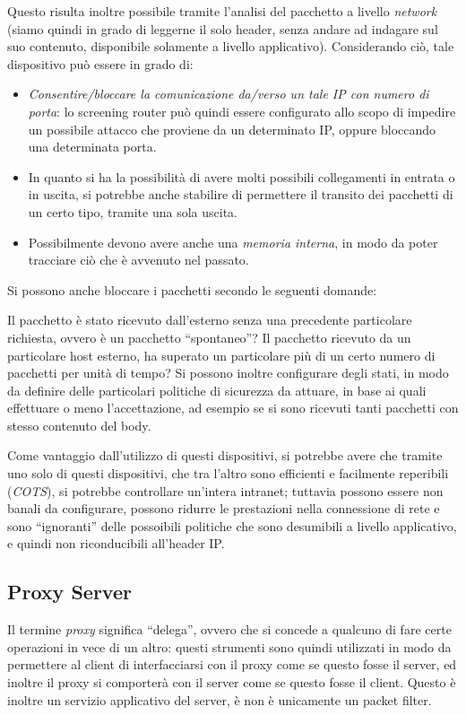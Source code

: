 Questo risulta inoltre possibile tramite l'analisi del pacchetto a livello
\textit{network} (siamo quindi in grado di leggerne il solo header, senza andare ad
indagare sul suo contenuto, disponibile solamente a livello applicativo). 
Considerando ciò, tale dispositivo può essere in grado di:
\begin{itemize}
\item \textit{Consentire/bloccare la comunicazione da/verso un tale IP con numero di
	porta}: lo screening router può quindi essere configurato allo scopo di
	impedire un possibile attacco che proviene da un determinato IP, oppure
	bloccando una determinata porta.
\item In quanto si ha la possibilità di avere molti possibili collegamenti in
	entrata o in uscita, si potrebbe anche stabilire di permettere il transito
	dei pacchetti di un certo tipo, tramite una sola uscita.
\item Possibilmente devono avere anche una \textit{memoria interna}, in modo da poter
	tracciare ciò che è avvenuto nel passato.
\end{itemize}
Si possono anche bloccare i pacchetti secondo le seguenti domande:
\begin{itemize}
\diam Il pacchetto è stato ricevuto dall'esterno senza una precedente particolare
	richiesta, ovvero è un pacchetto ``spontaneo''?
\diam Il pacchetto ricevuto da un particolare host esterno, ha superato un
	particolare più di un certo numero di pacchetti per unità di tempo?
\diam Si possono inoltre configurare degli stati, in modo da definire delle
	particolari politiche di sicurezza da attuare, in base ai quali effettuare
	o meno l'accettazione, ad esempio se si sono ricevuti tanti pacchetti con 
	stesso contenuto del body.
\end{itemize}
Come vantaggio dall'utilizzo di questi dispositivi, si potrebbe avere che tramite
uno solo di questi dispositivi, che tra l'altro sono efficienti e facilmente
reperibili (\textit{COTS}), si potrebbe controllare un'intera intranet; tuttavia possono essere
non banali da configurare, possono ridurre le prestazioni nella connessione di 
rete e sono ``ignoranti'' delle possoibili politiche che sono desumibili a 
livello applicativo, e quindi non riconducibili all'header IP. 

\subsection{Proxy Server}
Il termine \textit{proxy} significa ``delega'', ovvero che si concede a qualcuno
di fare certe operazioni in vece di un altro: questi strumenti sono quindi
utilizzati in modo da permettere al client di interfacciarsi con il proxy
come se questo fosse il server, ed inoltre il proxy si comporterà con il server
come se questo fosse il client. Questo è inoltre un servizio applicativo del 
server, è non è unicamente un packet filter.


